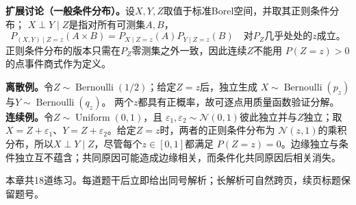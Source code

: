 \textbf{扩展讨论（一般条件分布）。}设$X,Y,Z$取值于标准Borel空间，并取其正则条件分布；
$X\perp Y\mid Z$是指对所有可测集$A,B$，
\[
P_{(X,Y)\mid Z=z}(A\times B)
=P_{X\mid Z=z}(A)P_{Y\mid Z=z}(B)
\quad\text{对$P_Z$几乎处处的$z$成立。}
\]
正则条件分布的版本只需在$P_Z$零测集之外一致，因此连续$Z$不能用
$P(Z=z)>0$的点事件商式作为定义。

\textbf{离散例。}令$Z\sim\operatorname{Bernoulli}(1/2)$；给定$Z=z$后，独立生成
$X\sim\operatorname{Bernoulli}(p_z)$与$Y\sim\operatorname{Bernoulli}(q_z)$。
两个$z$都具有正概率，故可逐点用质量函数验证分解。
\textbf{连续例。}令$Z\sim\operatorname{Uniform}(0,1)$，且
$\varepsilon_1,\varepsilon_2\sim\mathcal N(0,1)$彼此独立并与$Z$独立；取
$X=Z+\varepsilon_1$、$Y=Z+\varepsilon_2$。给定$Z=z$时，两者的正则条件分布为
$\mathcal N(z,1)$的乘积分布，所以$X\perp Y\mid Z$，尽管每个$z\in[0,1]$都满足
$P(Z=z)=0$。边缘独立与条件独立互不蕴含；共同原因可能造成边缘相关，而条件化共同原因后相关消失。

\label{struct:V1-C04-CH16}
\begin{chapterexercisebox}
\label{struct:V1-C04-CH34}
\label{struct:V1-C04-CH35}
本章共18道练习。每道题干后立即给出同号解析；长解析可自然跨页，续页标题保留题号。
\end{chapterexercisebox}

